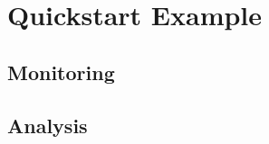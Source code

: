 \chapter{Quickstart Example}\label{chp:Quickstart-Example}
	\section{Monitoring}
	\section{Analysis}